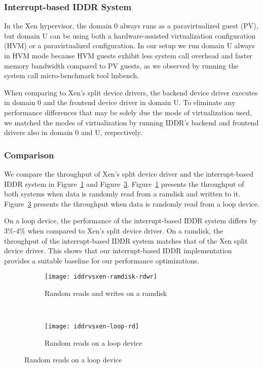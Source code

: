 \subsubsection*{Interrupt-based IDDR System}
In the Xen hypervisor, the domain 0 always runs as a paravirtualized guest (PV),
but domain U can be using both a hardware-assisted virtualization configuration (HVM) 
or a paravirtualized configuration.  In our setup we run domain U always
in HVM mode because HVM guests exhibit less system call overhead
and faster memory bandwidth compared to PV guests, as we observed
by running the system call micro-benchmark tool lmbench\cite{lmbench}. 

When comparing to Xen's split device drivers, the backend device driver executes
in domain 0 and the frontend device driver in domain U.  
To eliminate any performance differences that may be solely due the mode
of virtualization used, we matched the modes of virtualization
by running IDDR's backend and frontend drivers also in 
domain 0 and U, respectively.

\subsubsection*{Comparison}
We compare the throughput of Xen's split device driver and the
interrupt-based IDDR system in Figure~\ref{fig:iddrvsxen-ramdisk-rdwr}
and Figure~\ref{fig:iddrvsxen-loop-rd}. 
Figure~\ref{fig:iddrvsxen-ramdisk-rdwr} presents the
throughput of both systems when data is randomly read from a ramdisk and
written to it. Figure~\ref{fig:iddrvsxen-loop-rd} presents the throughput
when data is randomly read from a loop device.

On a loop device, the performance of the interrupt-based IDDR system
differs by 3\%-4\% when compared to Xen's split device driver. On a
ramdisk, the throughput of the interrupt-based IDDR system matches that
of the Xen split device driver. This shows that our interrupt-based
IDDR implementation provides a suitable baseline for our performance 
optimizations.

\begin{figure}[!ht]
\centering
  \begin{subfigure}[b]{\textwidth}
  \texttt{[image: iddrvsxen-ramdisk-rdwr]}
  \caption{Random reads and writes on a ramdisk}
  \label{fig:iddrvsxen-ramdisk-rdwr}
  \end{subfigure}\\
  \begin{subfigure}[b]{\textwidth}
  \texttt{[image: iddrvsxen-loop-rd]}
  \caption{Random reads on a loop device}
  \label{fig:iddrvsxen-loop-rd}
  \end{subfigure}
\end{figure}

